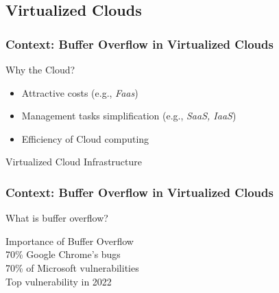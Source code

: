 \documentclass[xcolor=table,bigger,unknownkeysallowed]{beamer}
\begin{document}
\subsection{Virtualized Clouds}
\begin{frame}
	\frametitle{Context: Buffer Overflow in Virtualized Clouds}
		Why the Cloud?
		\begin{itemize}
			\item Attractive costs (e.g., \textit{Faas})
			\item Management tasks simplification (e.g., \textit{SaaS, IaaS})
			\item Efficiency of Cloud computing
		\end{itemize}

	\pause
	
	Virtualized Cloud Infrastructure
	\begin{figure}
	\centering
	\end{figure}
\end{frame}
\begin{frame}
	\frametitle{Context: Buffer Overflow in Virtualized Clouds}
	What is buffer overflow?
	\begin{figure}
	\end{figure}

	\pause
	
	Importance of Buffer Overflow\\
	 70\% Google Chrome's bugs\\
	 70\% of Microsoft vulnerabilities\\
	 Top vulnerability in 2022
\end{frame}
\end{document}
